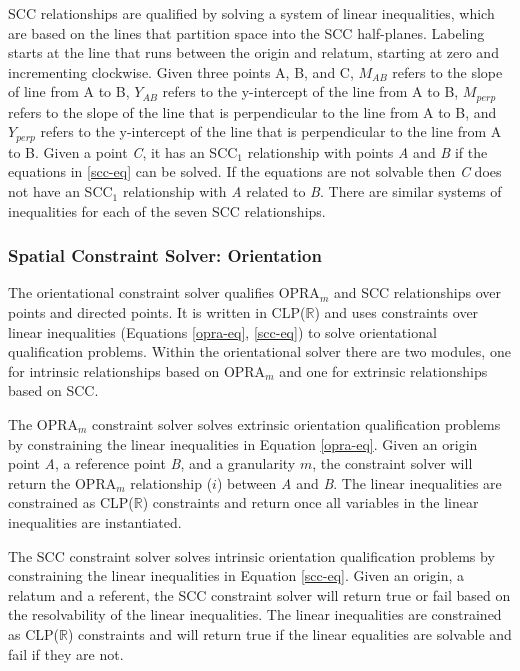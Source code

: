 \documentclass[12pt]{ucthesis}
\begin{document}
SCC relationships are qualified by solving a system of linear inequalities, which are based on the lines that partition space into the SCC half-planes. Labeling starts at the line that runs between the origin and relatum, starting at zero and incrementing clockwise. Given three points A, B, and C, $M_{AB}$ refers to the slope of line from A to B, $Y_{AB}$ refers to the y-intercept of the line from A to B, $M_{perp}$ refers to the slope of the line that is perpendicular to the line from A to B, and $Y_{perp}$ refers to the y-intercept of the line that is perpendicular to the line from A to B. Given a point \emph{C}, it has an SCC$_{1}$ relationship with points \emph{A} and \emph{B} if the equations in \ref{scc-eq} can be solved. If the equations are not solvable then \emph{C} does not have an SCC$_{1}$ relationship with \emph{A} related to \emph{B}. There are similar systems of inequalities for each of the seven SCC relationships.  


\subsubsection{Spatial Constraint Solver: Orientation}
The orientational constraint solver qualifies OPRA$_{m}$ and SCC relationships over points and directed points. It is written in CLP($\mathbb{R}$) and uses constraints over linear inequalities (Equations \ref{opra-eq}, \ref{scc-eq}) to solve orientational qualification problems. Within the orientational solver there are two modules, one for intrinsic relationships based on OPRA$_{m}$ and one for extrinsic relationships based on SCC.

The OPRA$_{m}$ constraint solver solves extrinsic orientation qualification problems by constraining the linear inequalities in Equation \ref{opra-eq}. Given an origin point \emph{A}, a reference point \emph{B}, and a granularity $m$, the constraint solver will return the OPRA$_{m}$ relationship ($i$) between \emph{A} and \emph{B}. The linear inequalities are constrained as CLP($\mathbb{R}$) constraints and return once all variables in the linear inequalities are instantiated. 

The SCC constraint solver solves intrinsic orientation qualification problems by constraining the linear inequalities in Equation \ref{scc-eq}. Given an origin, a relatum and a referent, the SCC constraint solver will return true or fail based on the resolvability of the linear inequalities. The linear inequalities are constrained as CLP($\mathbb{R}$) constraints and will return true if the linear equalities are solvable and fail if they are not.
\end{document}
